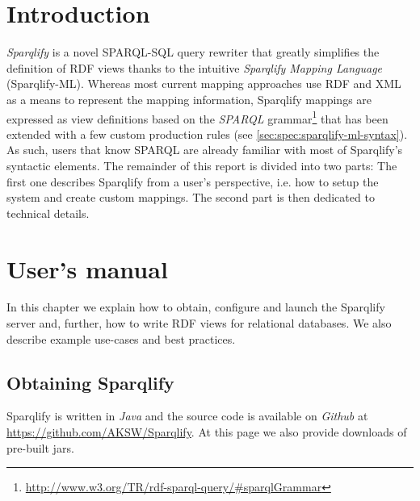 \documentclass[a4paper,twoside,bibtotoc,abstracton,12pt,BCOR=15mm]{scrreprt}
\begin{document}
 


% 




\tableofcontents

\chapter*{Introduction}
\emph{Sparqlify} is a novel SPARQL-SQL query rewriter that greatly simplifies the definition of RDF views thanks to the intuitive
\emph{Sparqlify Mapping Language} (Sparqlify-ML).
Whereas most current mapping approaches use RDF and XML as a means to represent the mapping information,
Sparqlify mappings are expressed as view definitions based on the \emph{SPARQL} grammar\footnote{\url{http://www.w3.org/TR/rdf-sparql-query/\#sparqlGrammar}} that has been
extended with a few custom production rules (see \autoref{sec:spec:sparqlify-ml-syntax}).
As such, users that know SPARQL are already familiar with most of Sparqlify's syntactic elements.
The remainder of this report is divided into two parts:
The first one describes Sparqlify from a user's perspective, i.e. how
to setup the system and create custom mappings. 
The second part is then dedicated to technical details. 


\chapter{User's manual}
In this chapter we explain how to obtain, configure and launch the Sparqlify server and, further, 
how to write RDF views for relational databases.
We also describe example use-cases and best practices.

\section{Obtaining Sparqlify}
Sparqlify is written in \emph{Java} and the source code is available on \emph{Github} at \url{https://github.com/AKSW/Sparqlify}.
At this page we also provide downloads of pre-built jars.
\end{document}
